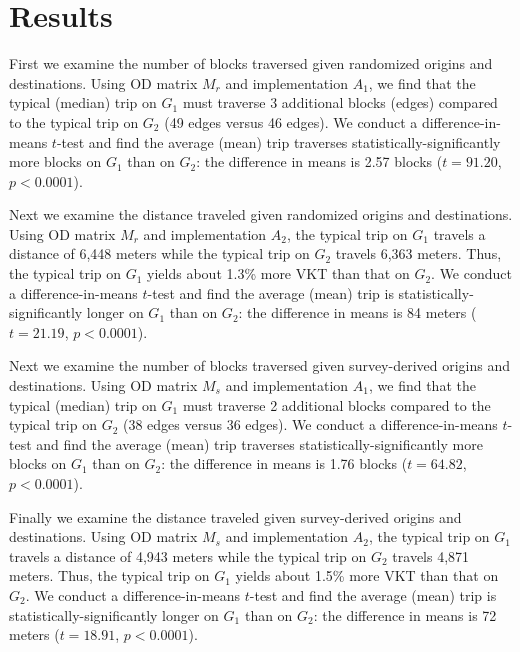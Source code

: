 \documentclass{trbunofficial}
\begin{document}
\section{Results}

First we examine the number of blocks traversed given randomized origins and destinations. Using OD matrix $M_r$ and implementation $A_1$, we find that the typical (median) trip on $G_1$ must traverse 3 additional blocks (edges) compared to the typical trip on $G_2$ (49 edges versus 46 edges). We conduct a difference-in-means $t$-test and find the average (mean) trip traverses statistically-significantly more blocks on $G_1$ than on $G_2$: the difference in means is 2.57 blocks ($t=91.20$, $p<0.0001$).

Next we examine the distance traveled given randomized origins and destinations. Using OD matrix $M_r$ and implementation $A_2$, the typical trip on $G_1$ travels a distance of 6,448 meters while the typical trip on $G_2$ travels 6,363 meters. Thus, the typical trip on $G_1$ yields about 1.3\% more VKT than that on $G_2$. We conduct a difference-in-means $t$-test and find the average (mean) trip is statistically-significantly longer on $G_1$ than on $G_2$: the difference in means is 84 meters ($t=21.19$, $p<0.0001$).

Next we examine the number of blocks traversed given survey-derived origins and destinations. Using OD matrix $M_s$ and implementation $A_1$, we find that the typical (median) trip on $G_1$ must traverse 2 additional blocks compared to the typical trip on $G_2$ (38 edges versus 36 edges). We conduct a difference-in-means $t$-test and find the average (mean) trip traverses statistically-significantly more blocks on $G_1$ than on $G_2$: the difference in means is 1.76 blocks ($t=64.82$, $p<0.0001$).

Finally we examine the distance traveled given survey-derived origins and destinations. Using OD matrix $M_s$ and implementation $A_2$, the typical trip on $G_1$ travels a distance of 4,943 meters while the typical trip on $G_2$ travels 4,871 meters. Thus, the typical trip on $G_1$ yields about 1.5\% more VKT than that on $G_2$. We conduct a difference-in-means $t$-test and find the average (mean) trip is statistically-significantly longer on $G_1$ than on $G_2$: the difference in means is 72 meters ($t=18.91$, $p<0.0001$).
\end{document}

